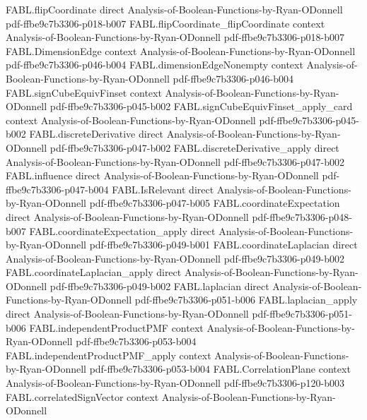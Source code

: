 \begin{theorem}
\proofstep
  {FABL.flipCoordinate}
  {direct}
  {Analysis-of-Boolean-Functions-by-Ryan-ODonnell}
  {pdf-ffbe9c7b3306-p018-b007}
\proofstep
  {FABL.flipCoordinate_flipCoordinate}
  {context}
  {Analysis-of-Boolean-Functions-by-Ryan-ODonnell}
  {pdf-ffbe9c7b3306-p018-b007}
\proofstep
  {FABL.DimensionEdge}
  {context}
  {Analysis-of-Boolean-Functions-by-Ryan-ODonnell}
  {pdf-ffbe9c7b3306-p046-b004}
\proofstep
  {FABL.dimensionEdgeNonempty}
  {context}
  {Analysis-of-Boolean-Functions-by-Ryan-ODonnell}
  {pdf-ffbe9c7b3306-p046-b004}
\proofstep
  {FABL.signCubeEquivFinset}
  {context}
  {Analysis-of-Boolean-Functions-by-Ryan-ODonnell}
  {pdf-ffbe9c7b3306-p045-b002}
\proofstep
  {FABL.signCubeEquivFinset_apply_card}
  {context}
  {Analysis-of-Boolean-Functions-by-Ryan-ODonnell}
  {pdf-ffbe9c7b3306-p045-b002}
\proofstep
  {FABL.discreteDerivative}
  {direct}
  {Analysis-of-Boolean-Functions-by-Ryan-ODonnell}
  {pdf-ffbe9c7b3306-p047-b002}
\proofstep
  {FABL.discreteDerivative_apply}
  {direct}
  {Analysis-of-Boolean-Functions-by-Ryan-ODonnell}
  {pdf-ffbe9c7b3306-p047-b002}
\proofstep
  {FABL.influence}
  {direct}
  {Analysis-of-Boolean-Functions-by-Ryan-ODonnell}
  {pdf-ffbe9c7b3306-p047-b004}
\proofstep
  {FABL.IsRelevant}
  {direct}
  {Analysis-of-Boolean-Functions-by-Ryan-ODonnell}
  {pdf-ffbe9c7b3306-p047-b005}
\proofstep
  {FABL.coordinateExpectation}
  {direct}
  {Analysis-of-Boolean-Functions-by-Ryan-ODonnell}
  {pdf-ffbe9c7b3306-p048-b007}
\proofstep
  {FABL.coordinateExpectation_apply}
  {direct}
  {Analysis-of-Boolean-Functions-by-Ryan-ODonnell}
  {pdf-ffbe9c7b3306-p049-b001}
\proofstep
  {FABL.coordinateLaplacian}
  {direct}
  {Analysis-of-Boolean-Functions-by-Ryan-ODonnell}
  {pdf-ffbe9c7b3306-p049-b002}
\proofstep
  {FABL.coordinateLaplacian_apply}
  {direct}
  {Analysis-of-Boolean-Functions-by-Ryan-ODonnell}
  {pdf-ffbe9c7b3306-p049-b002}
\proofstep
  {FABL.laplacian}
  {direct}
  {Analysis-of-Boolean-Functions-by-Ryan-ODonnell}
  {pdf-ffbe9c7b3306-p051-b006}
\proofstep
  {FABL.laplacian_apply}
  {direct}
  {Analysis-of-Boolean-Functions-by-Ryan-ODonnell}
  {pdf-ffbe9c7b3306-p051-b006}
\proofstep
  {FABL.independentProductPMF}
  {context}
  {Analysis-of-Boolean-Functions-by-Ryan-ODonnell}
  {pdf-ffbe9c7b3306-p053-b004}
\proofstep
  {FABL.independentProductPMF_apply}
  {context}
  {Analysis-of-Boolean-Functions-by-Ryan-ODonnell}
  {pdf-ffbe9c7b3306-p053-b004}
\proofstep
  {FABL.CorrelationPlane}
  {context}
  {Analysis-of-Boolean-Functions-by-Ryan-ODonnell}
  {pdf-ffbe9c7b3306-p120-b003}
\proofstep
  {FABL.correlatedSignVector}
  {context}
  {Analysis-of-Boolean-Functions-by-Ryan-ODonnell}

\end{theorem}

